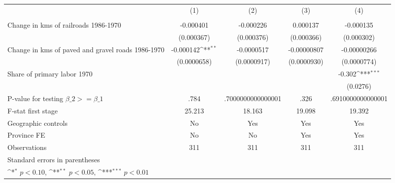 {
\def\sym#1{\ifmmode^{#1}\else\(^{#1}\)\fi}
\begin{tabular}{l*{4}{c}}
\hline\hline
                &\multicolumn{1}{c}{(1)}&\multicolumn{1}{c}{(2)}&\multicolumn{1}{c}{(3)}&\multicolumn{1}{c}{(4)}\\
                &\multicolumn{1}{c}{}&\multicolumn{1}{c}{}&\multicolumn{1}{c}{}&\multicolumn{1}{c}{}\\
\hline
Change in kms of railroads 1986-1970&-0.000401         &-0.000226         & 0.000137         &-0.000135         \\
                &(0.000367)         &(0.000376)         &(0.000366)         &(0.000302)         \\
[1em]
Change in kms of paved and gravel roads 1986-1970&-0.000142\sym{**} &-0.0000517         &-0.00000807         &-0.00000266         \\
                &(0.0000658)         &(0.0000917)         &(0.0000930)         &(0.0000774)         \\
[1em]
Share of primary labor 1970&                  &                  &                  &   -0.302\sym{***}\\
                &                  &                  &                  & (0.0276)         \\
\hline
P-value for testing $\beta\_{2} >= \beta\_{1}$&     .784         &.7000000000000001         &     .326         &.6910000000000001         \\
F-stat first stage&   25.213         &   18.163         &   19.098         &   19.392         \\
Geographic controls&       No         &      Yes         &      Yes         &      Yes         \\
Province FE     &       No         &       No         &      Yes         &      Yes         \\
Observations    &      311         &      311         &      311         &      311         \\
\hline\hline
\multicolumn{5}{l}{\footnotesize Standard errors in parentheses}\\
\multicolumn{5}{l}{\footnotesize \sym{*} \(p<0.10\), \sym{**} \(p<0.05\), \sym{***} \(p<0.01\)}\\
\end{tabular}
}

